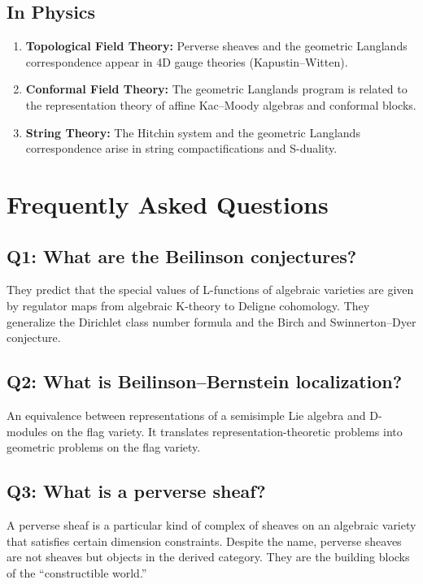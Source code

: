 \subsection{In Physics}

\begin{enumerate}
    \item \textbf{Topological Field Theory:} Perverse sheaves and the geometric Langlands correspondence appear in 4D gauge theories (Kapustin--Witten).
    \item \textbf{Conformal Field Theory:} The geometric Langlands program is related to the representation theory of affine Kac--Moody algebras and conformal blocks.
    \item \textbf{String Theory:} The Hitchin system and the geometric Langlands correspondence arise in string compactifications and S-duality.
\end{enumerate}

\section{Frequently Asked Questions}

\subsection*{Q1: What are the Beilinson conjectures?}
They predict that the special values of L-functions of algebraic varieties are given by regulator maps from algebraic K-theory to Deligne cohomology. They generalize the Dirichlet class number formula and the Birch and Swinnerton--Dyer conjecture.

\subsection*{Q2: What is Beilinson--Bernstein localization?}
An equivalence between representations of a semisimple Lie algebra and D-modules on the flag variety. It translates representation-theoretic problems into geometric problems on the flag variety.

\subsection*{Q3: What is a perverse sheaf?}
A perverse sheaf is a particular kind of complex of sheaves on an algebraic variety that satisfies certain dimension constraints. Despite the name, perverse sheaves are not sheaves but objects in the derived category. They are the building blocks of the ``constructible world.''

